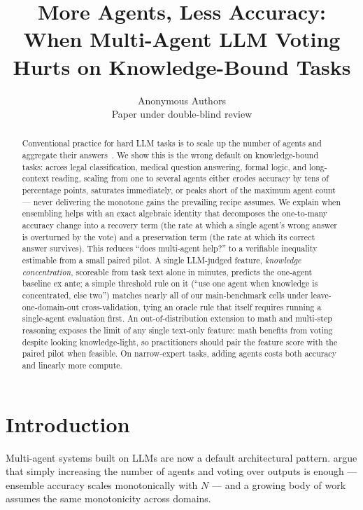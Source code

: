 \documentclass{article}
\title{More Agents, Less Accuracy:\\When Multi-Agent LLM Voting Hurts on Knowledge-Bound Tasks}
\author{
  Anonymous Authors\\
  Paper under double-blind review
}
\begin{document}
\maketitle

\begin{abstract}
Conventional practice for hard LLM tasks is to scale up the number of agents and aggregate their answers~\citep{li2024moreagents}. We show this is the wrong default on knowledge-bound tasks: across legal classification, medical question answering, formal logic, and long-context reading, scaling from one to several agents either erodes accuracy by tens of percentage points, saturates immediately, or peaks short of the maximum agent count --- never delivering the monotone gains the prevailing recipe assumes. We explain when ensembling helps with an exact algebraic identity that decomposes the one-to-many accuracy change into a recovery term (the rate at which a single agent's wrong answer is overturned by the vote) and a preservation term (the rate at which its correct answer survives). This reduces ``does multi-agent help?'' to a verifiable inequality estimable from a small paired pilot. A single LLM-judged feature, \emph{knowledge concentration}, scoreable from task text alone in minutes, predicts the one-agent baseline ex ante; a simple threshold rule on it (``use one agent when knowledge is concentrated, else two'') matches nearly all of our main-benchmark cells under leave-one-domain-out cross-validation, tying an oracle rule that itself requires running a single-agent evaluation first. An out-of-distribution extension to math and multi-step reasoning exposes the limit of any single text-only feature: math benefits from voting despite looking knowledge-light, so practitioners should pair the feature score with the paired pilot when feasible. On narrow-expert tasks, adding agents costs both accuracy and linearly more compute.
\end{abstract}


\section{Introduction}
\label{sec:intro}

Multi-agent systems built on LLMs are now a default architectural pattern. \citet{li2024moreagents} argue that simply increasing the number of agents and voting over outputs is enough --- ensemble accuracy scales monotonically with $N$ --- and a growing body of work assumes the same monotonicity across domains.
\end{document}

